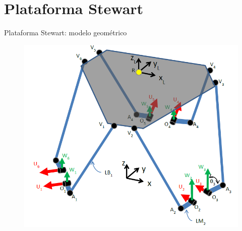 \documentclass{beamer}
\begin{document}
\section{Plataforma Stewart}
\begin{frame}{Plataforma Stewart: modelo geométrico}

 \begin{figure}[h]
\centering
\includegraphics[scale=0.35]{plataform_stewart}

\end{figure}
\vskip 1cm
\end{frame}
\end{document}
